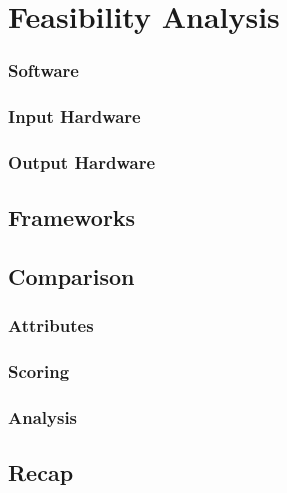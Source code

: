 \chapter{Feasibility Analysis}\label{ch:feasibility}

\subsection{Software}

\subsection{Input Hardware}

\subsection{Output Hardware}

\section{Frameworks}\label{sc:feasibility:frameworks}

\section{Comparison}\label{sc:feasibility:comparison}

\subsection{Attributes}

\subsection{Scoring}

\subsection{Analysis}

\section{Recap}\label{sc:feasibility:recap}
